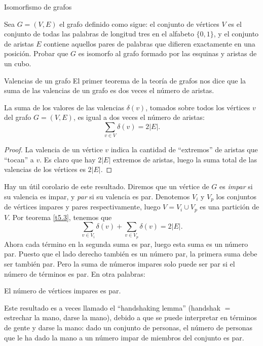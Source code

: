 \begin{section}{Isomorfismo de grafos}
\begin{enumex}
\item Sea $G=(V,E)$ el grafo definido como sigue: el conjunto de vértices $V$ es el conjunto de todas las palabras de longitud tres en el alfabeto $\{0,1\}$, y el conjunto de aristas $E$ contiene aquellos pares de palabras que difieren exactamente en una posición. Probar que $G$ es isomorfo al grafo formado por las esquinas y aristas de un cubo.
\end{enumex}

\end{section}


\begin{section}{Valencias de un grafo}\label{seccion-valencias-de-un-grafo}
El primer teorema de la teoría de grafos nos dice que la suma de las valencias de un grafo  es dos veces el número de aristas.

\begin{teorema}\label{t5.3} La suma de los valores de las valencias $\delta(v)$, tomados sobre todos los vértices $v$ del grafo $G=(V,E)$, es igual a dos veces el número de aristas:
$$
\sum_{v \in V} \delta(v) = 2|E|.
$$
\end{teorema}
\begin{proof} La valencia de un vértice $v$ indica la cantidad de ``extremos'' de aristas que ``tocan'' a $v$. Es claro que hay $2|E|$ extremos de aristas, luego la suma total de las valencias de los vértices es $2|E|$.
\end{proof}

Hay un útil corolario de este resultado. Diremos que un vértice de $G$ es \textit{impar} si su     valencia es impar, y \textit{par} si su valencia es par. Denotemos $V_i$ y $V_p$ los conjuntos de vértices impares y pares respectivamente, luego $V=V_i \cup V_p$ es una partición de $V$. Por teorema \ref{t5.3}, tenemos que
$$
\sum_{v \in V_i} \delta(v) + \sum_{v \in V_p} \delta(v)= 2|E|.
$$
Ahora cada término en la segunda suma es par, luego esta suma es un número par. Puesto que el lado derecho también es un número par, la primera suma debe ser también par. Pero la suma de números impares solo puede ser par si el número de términos es par. En otra palabras:

\begin{teorema} El número de vértices impares es par.
\end{teorema}

Este resultado es a veces llamado el ``handshaking lemma'' (handshak $=$ estrechar la mano, darse la   mano), debido a que se puede interpretar en términos de gente y darse la mano: dado un conjunto de personas, el número de personas que le ha dado la mano a un número impar de miembros del conjunto
es par. 


\end{section}
